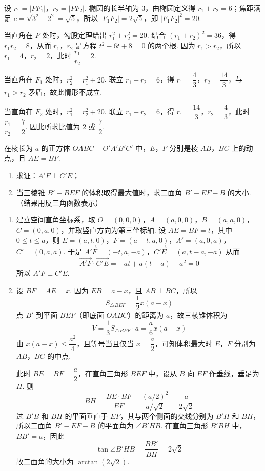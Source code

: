\begin{solution}
设 \(r_1=|PF_1|\)，\(r_2=|PF_2|\). 椭圆的长半轴为 \(3\)，由椭圆定义得 \(r_1+r_2=6\)；焦距满足 \(c=\sqrt{3^2-2^2}=\sqrt{5}\)，所以 \(|F_1F_2|=2\sqrt{5}\)，即 \(|F_1F_2|^2=20\).

当直角在 \(P\) 处时，勾股定理给出 \(r_1^2+r_2^2=20\). 结合 \((r_1+r_2)^2=36\)，得 \(r_1r_2=8\)，从而 \(r_1\)，\(r_2\) 是方程 \(t^2-6t+8=0\) 的两个根. 因为 \(r_1>r_2\)，所以 \(r_1=4\)，\(r_2=2\)，此时 \(\dfrac{r_1}{r_2}=2\).

当直角在 \(F_1\) 处时，\(r_2^2=r_1^2+20\). 联立 \(r_1+r_2=6\)，得 \(r_1=\dfrac{4}{3}\)，\(r_2=\dfrac{14}{3}\)，与 \(r_1>r_2\) 矛盾，故此情形不成立.

当直角在 \(F_2\) 处时，\(r_1^2=r_2^2+20\). 联立 \(r_1+r_2=6\)，得 \(r_1=\dfrac{14}{3}\)，\(r_2=\dfrac{4}{3}\)，此时 \(\dfrac{r_1}{r_2}=\dfrac{7}{2}\). 因此所求比值为 \(2\) 或 \(\dfrac{7}{2}\).
\end{solution}

\begin{problem}
在棱长为 \(a\) 的正方体 \(OABC-O'A'B'C'\) 中，\(E\)，\(F\) 分别是棱 \(AB\)，\(BC\) 上的动点，且 \(AE=BF\).
\begin{enumerate}
\item 求证：\(A'F\perp C'E\)；
\item 当三棱锥 \(B'-BEF\) 的体积取得最大值时，求二面角 \(B'-EF-B\) 的大小.（结果用反三角函数表示）
\end{enumerate}
\end{problem}

\begin{solution}
\begin{enumerate}
\item 建立空间直角坐标系，取 \(O=(0,0,0)\)，\(A=(a,0,0)\)，\(B=(a,a,0)\)，\(C=(0,a,0)\)，并取竖直方向为第三坐标轴. 设 \(AE=BF=t\)，其中 \(0\leqslant t\leqslant a\)，则
\(E=(a,t,0)\)，\(F=(a-t,a,0)\)，\(A'=(a,0,a)\)，\(C'=(0,a,a)\).
于是
\(\overrightarrow{A'F}=(-t,a,-a)\)，\(\overrightarrow{C'E}=(a,t-a,-a)\)
从而
\[
\overrightarrow{A'F}\cdot\overrightarrow{C'E}=-at+a(t-a)+a^2=0
\]
所以 \(A'F\perp C'E\).
\item 设 \(BF=AE=x\). 因为 \(EB=a-x\)，且 \(AB\perp BC\)，所以
\[
S_{\triangle BEF}=\frac{1}{2}x(a-x)
\]
点 \(B'\) 到平面 \(BEF\)（即底面 \(OABC\)）的距离为 \(a\)，故三棱锥体积为
\[
V=\frac{1}{3}S_{\triangle BEF}\cdot a=\frac{a}{6}x(a-x)
\]
由 \(x(a-x)\leqslant\dfrac{a^2}{4}\)，且等号当且仅当 \(x=\dfrac{a}{2}\)，可知体积最大时 \(E\)，\(F\) 分别为 \(AB\)，\(BC\) 的中点.

此时 \(BE=BF=\dfrac{a}{2}\)，在直角三角形 \(BEF\) 中，设从 \(B\) 向 \(EF\) 作垂线，垂足为 \(H\). 则
\[
BH=\frac{BE\cdot BF}{EF}=\frac{(a/2)^2}{a/\sqrt{2}}=\frac{a}{2\sqrt{2}}
\]
过 \(B'B\) 和 \(BH\) 的平面垂直于 \(EF\)，其与两个侧面的交线分别为 \(B'H\) 和 \(BH\)，所以二面角 \(B'-EF-B\) 的平面角为 \(\angle B'HB\). 在直角三角形 \(B'BH\) 中，\(BB'=a\)，因此
\[
\tan\angle B'HB=\frac{BB'}{BH}=2\sqrt{2}
\]
故二面角的大小为 \(\arctan\left(2\sqrt{2}\right)\).
\end{enumerate}
\end{solution}

